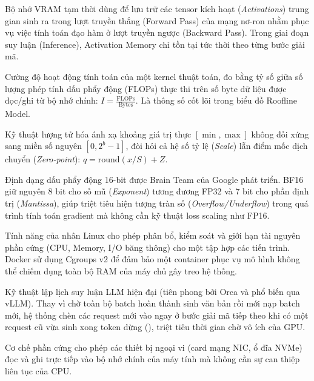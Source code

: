 \begin{description}[leftmargin=2.5cm, style=nextline]
  \item[\term{Activation Memory}] Bộ nhớ VRAM tạm thời dùng để lưu trữ các tensor kích hoạt (\textit{Activations}) trung gian sinh ra trong lượt truyền thẳng (Forward Pass) của mạng nơ-ron nhằm phục vụ việc tính toán đạo hàm ở lượt truyền ngược (Backward Pass). Trong giai đoạn suy luận (Inference), Activation Memory chỉ tồn tại tức thời theo từng bước giải mã.

  \item[\term{Arithmetic Intensity}] Cường độ hoạt động tính toán của một kernel thuật toán, đo bằng tỷ số giữa số lượng phép tính dấu phẩy động (FLOPs) thực thi trên số byte dữ liệu được đọc/ghi từ bộ nhớ chính: $I = \frac{\text{FLOPs}}{\text{Bytes}}$. Là thông số cốt lõi trong biểu đồ Roofline Model.

  \item[\term{Asymmetric Quantization}] Kỹ thuật lượng tử hóa ánh xạ khoảng giá trị thực $[\min, \max]$ không đối xứng sang miền số nguyên $[0, 2^b - 1]$, đòi hỏi cả hệ số tỷ lệ (\textit{Scale}) lẫn điểm mốc dịch chuyển (\textit{Zero-point}): $q = \text{round}(x / S) + Z$.

  \item[\term{BF16 (Bfloat16)}] Định dạng dấu phẩy động 16-bit được Brain Team của Google phát triển. BF16 giữ nguyên 8 bit cho số mũ (\textit{Exponent}) tương đương FP32 và 7 bit cho phần định trị (\textit{Mantissa}), giúp triệt tiêu hiện tượng tràn số (\textit{Overflow/Underflow}) trong quá trình tính toán gradient mà không cần kỹ thuật loss scaling như FP16.

  \item[\term{Cgroups v2 (Control Groups)}] Tính năng của nhân Linux cho phép phân bổ, kiểm soát và giới hạn tài nguyên phần cứng (CPU, Memory, I/O băng thông) cho một tập hợp các tiến trình. Docker sử dụng Cgroups v2 để đảm bảo một container phục vụ mô hình không thể chiếm dụng toàn bộ RAM của máy chủ gây treo hệ thống.

  \item[\term{Continuous Batching (Iteration-Level Batching)}] Kỹ thuật lập lịch suy luận LLM hiện đại (tiên phong bởi Orca và phổ biến qua vLLM). Thay vì chờ toàn bộ batch hoàn thành sinh văn bản rồi mới nạp batch mới, hệ thống chèn các request mới vào ngay ở bước giải mã tiếp theo khi có một request cũ vừa sinh xong token dừng (), triệt tiêu thời gian chờ vô ích của GPU.

  \item[\term{Direct Memory Access (DMA)}] Cơ chế phần cứng cho phép các thiết bị ngoại vi (card mạng NIC, ổ đĩa NVMe) đọc và ghi trực tiếp vào bộ nhớ chính của máy tính mà không cần sự can thiệp liên tục của CPU.


\end{description}

